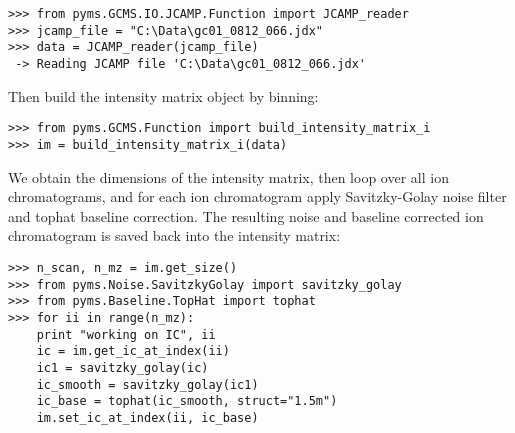 \begin{verbatim}
>>> from pyms.GCMS.IO.JCAMP.Function import JCAMP_reader
>>> jcamp_file = "C:\Data\gc01_0812_066.jdx"
>>> data = JCAMP_reader(jcamp_file)
 -> Reading JCAMP file 'C:\Data\gc01_0812_066.jdx'
\end{verbatim}

Then build the intensity matrix object by binning:

\begin{verbatim}
>>> from pyms.GCMS.Function import build_intensity_matrix_i
>>> im = build_intensity_matrix_i(data)
\end{verbatim}

We obtain the dimensions of the intensity matrix, then loop
over all ion chromatograms, and for each ion chromatogram
apply Savitzky-Golay noise filter and tophat baseline correction.
The resulting noise and baseline corrected ion chromatogram
is saved back into the intensity matrix:

\begin{verbatim}
>>> n_scan, n_mz = im.get_size()
>>> from pyms.Noise.SavitzkyGolay import savitzky_golay
>>> from pyms.Baseline.TopHat import tophat
>>> for ii in range(n_mz):
	print "working on IC", ii
	ic = im.get_ic_at_index(ii)
	ic1 = savitzky_golay(ic)
	ic_smooth = savitzky_golay(ic1)
	ic_base = tophat(ic_smooth, struct="1.5m")
	im.set_ic_at_index(ii, ic_base)
\end{verbatim}


